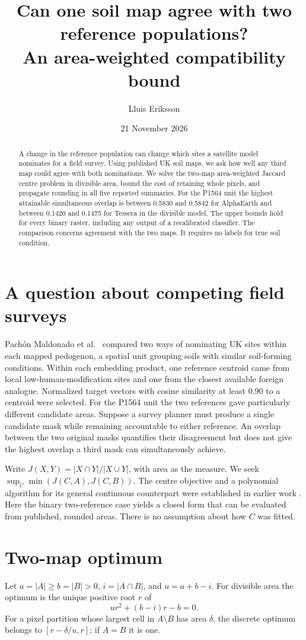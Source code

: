 \documentclass[11pt]{article}
\title{Can one soil map agree with two reference populations?\\An area-weighted compatibility bound}
\author{Lluis Eriksson}\date{21 November 2026}
\begin{document}
\maketitle
\begin{abstract}
A change in the reference population can change which sites a satellite model nominates for a field survey. Using published UK soil maps, we ask how well any third map could agree with both nominations. We solve the two-map area-weighted Jaccard centre problem in divisible area, bound the cost of retaining whole pixels, and propagate rounding in all five reported summaries. For the P1564 unit the highest attainable simultaneous overlap is between 0.5830 and 0.5842 for AlphaEarth and between 0.1420 and 0.1475 for Tessera in the divisible model. The upper bounds hold for every binary raster, including any output of a recalibrated classifier. The comparison concerns agreement with the two maps. It requires no labels for true soil condition.
\end{abstract}

\section{A question about competing field surveys}
Pach\'on Maldonado et al.\ \cite{soil} compared two ways of nominating UK sites within each mapped pedogenon, a spatial unit grouping soils with similar soil-forming conditions. Within each embedding product, one reference centroid came from local low-human-modification sites and one from the closest available foreign analogue. Normalized target vectors with cosine similarity at least 0.90 to a centroid were selected. For the P1564 unit the two references gave particularly different candidate areas. Suppose a survey planner must produce a single candidate mask while remaining accountable to either reference. An overlap between the two original masks quantifies their disagreement but does not give the highest overlap a third mask can simultaneously achieve.

Write $J(X,Y)=|X\cap Y|/|X\cup Y|$, with area as the measure. We seek $\sup_C\min(J(C,A),J(C,B))$. The centre objective and a polynomial algorithm for its general continuous counterpart were established in earlier work \cite{center}. Here the binary two-reference case yields a closed form that can be evaluated from published, rounded areas. There is no assumption about how $C$ was fitted.

\section{Two-map optimum}
Let $a=|A|\ge b=|B|>0$, $i=|A\cap B|$, and $u=a+b-i$. For divisible area the optimum is the unique positive root $r$ of
\[
   u r^2+(b-i)r-b=0.
\]
For a pixel partition whose largest cell in $A\setminus B$ has area $\delta$, the discrete optimum belongs to $[r-\delta/u,r]$; if $A=B$ it is one.
\end{document}
